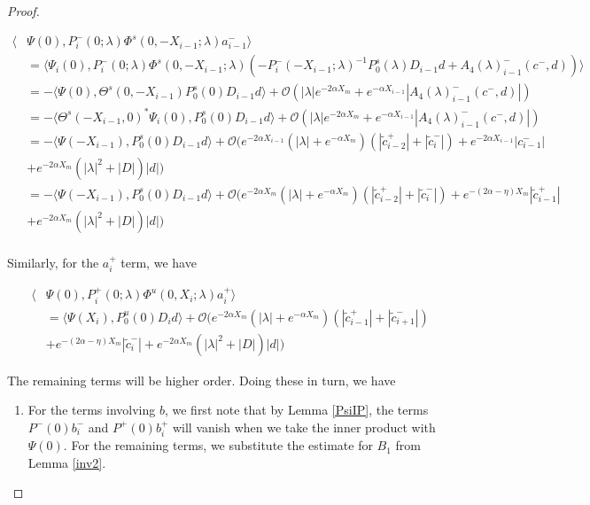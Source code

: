 \documentclass[thesis.tex]{subfiles}
\begin{document}
\begin{lemma}
\begin{proof}
\begin{enumerate}
\begin{align*}
\langle &\Psi(0), P_i^-(0; \lambda) \Phi^s(0, -X_{i-1}; \lambda) a_{i-1}^- \rangle \\
&= \langle \Psi_i(0), P_i^-(0; \lambda) \Phi^s(0, -X_{i-1}; \lambda) (- P_i^-(-X_{i-1}; \lambda)^{-1} P_0^s(\lambda) D_{i-1} d + A_4(\lambda)_{i-1}^-(c^-, d)) \rangle \\
&= -\langle \Psi(0), \Theta^s(0, -X_{i-1}) P_0^s(0) D_{i-1} d \rangle + \mathcal{O}( |\lambda|e^{-2 \alpha X_m} + e^{-\alpha X_{i-1}} |A_4(\lambda)_{i-1}^-(c^-, d)|)\\
&= -\langle \Theta^s(-X_{i-1}, 0)^* \Psi_i(0), P_0^s(0) D_{i-1} d \rangle + \mathcal{O}( |\lambda|e^{-2 \alpha X_m} + e^{-\alpha X_{i-1}} |A_4(\lambda)_{i-1}^-(c^-, d)|)\\
&= -\langle \Psi(-X_{i-1}), P_0^s(0) D_{i-1} d \rangle + \mathcal{O}\Big(  
e^{-2\alpha X_{i-1}} (|\lambda| + e^{-\alpha X_m})(|\tilde{c}_{i-2}^+| + |\tilde{c}_i^-|) + e^{-2\alpha X_{i-1}} |c_{i-1}^-| \\
&+ e^{-2 \alpha X_m}(|\lambda|^2 + |D|)|d| \Big) \\
&= -\langle \Psi(-X_{i-1}), P_0^s(0) D_{i-1} d \rangle 
+ \mathcal{O}\Big(  
e^{-2\alpha X_m} (|\lambda| + e^{-\alpha X_m})(|\tilde{c}_{i-2}^+| + |\tilde{c}_i^-|) + e^{-(2\alpha-\eta) X_m} |\tilde{c}_{i-1}^+| \\
&+ e^{-2 \alpha X_m}(|\lambda|^2 + |D|)|d| \Big) \\
\end{align*}

Similarly, for the $a_i^+$ term, we have

\begin{align*}
\langle &\Psi(0), P_i^+(0; \lambda) \Phi^u(0, X_i; \lambda) a_i^+ \rangle \\
&= \langle \Psi(X_i), P_0^u(0) D_i d \rangle + \mathcal{O}\Big( e^{-2 \alpha X_m} (|\lambda| + e^{-\alpha X_m})(|\tilde{c}_{i-1}^+| + |\tilde{c}_{i+1}^-|) \\
&+ e^{-(2 \alpha - \eta) X_m} |\tilde{c}_i^-| + e^{-2 \alpha X_m}(|\lambda|^2 + |D|)|d| \Big)
\end{align*}

\end{enumerate}

The remaining terms will be higher order. Doing these in turn, we have

\begin{enumerate}
\item For the terms involving $b$, we first note that by Lemma \ref{PsiIP}, the terms $P^-(0) b_i^-$ and $P^+(0)b_i^+$ will vanish when we take the inner product with $\Psi(0)$. For the remaining terms, we substitute the estimate for $B_1$ from Lemma \ref{inv2}.


\end{enumerate}
\end{proof}
\end{lemma}
\end{document}
